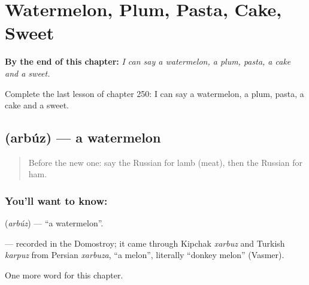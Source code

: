 
\chapter{Watermelon, Plum, Pasta, Cake, Sweet}
\label{ch:ru-watermelon-plum-pasta-cake-sweet}

\begin{chapteropening}
\textbf{By the end of this chapter:} \emph{I can say a watermelon, a plum, pasta, a cake and a sweet.}

Complete the last lesson of chapter 250: I can say a watermelon, a plum, pasta, a cake and a sweet.
\end{chapteropening}

\section[\texorpdfstring{\ru{арбуз} (arbúz)}{арбуз (arbúz)}]{ (arbúz) — a watermelon}

\label{lesson:RU-C250-arbuz}



\begin{quote}
Before the new one: say the Russian for lamb (meat), then the Russian for ham.
\end{quote}

\subsection*{You'll want to know: }
\textbf{} (\emph{arbúz}) — \textquotedblleft{}a watermelon\textquotedblright{}.

\begin{cousinweb}
\textbf{} — recorded in the Domostroy; it came through Kipchak \emph{xarbuz} and Turkish \emph{karpuz} from Persian \emph{xarbuza}, \textquotedblleft{}a melon\textquotedblright{}, literally \textquotedblleft{}donkey melon\textquotedblright{} (Vasmer).
\end{cousinweb}

\begin{grammarlens}[title={What you've built}]
One more word for this chapter.
\end{grammarlens}

